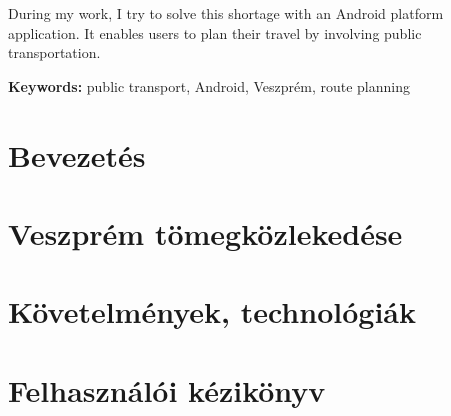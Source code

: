 \documentclass[a4paper,oneside,10pt]{report}
\begin{document}
During my work, I try to solve this shortage with an Android platform application.
It enables users to plan their travel by involving public transportation.

\textbf{Keywords:} public transport, Android, Veszprém, route planning

\tableofcontents
\newpage
\listoffigures
\newpage






\pagestyle{plain} %







\chapter{Bevezetés}
\label{bev}


\chapter{Veszprém tömegközlekedése}
\label{tom}


\chapter{Követelmények, technológiák}
\label{kov}


\chapter{Felhasználói kézikönyv}
\label{felhaszn}

\end{document}
